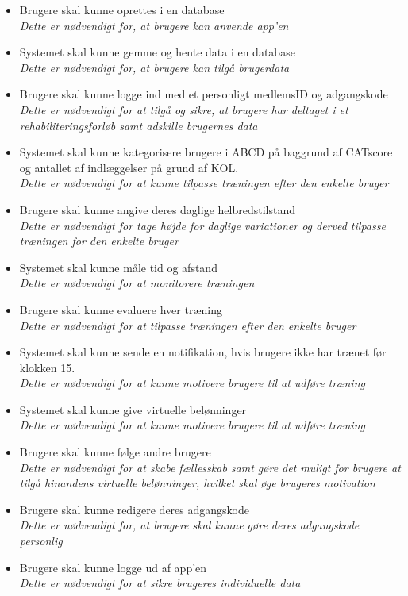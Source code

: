 \noindent 
\begin{itemize}
\item Brugere skal kunne oprettes i en database
	\\
	\textit{Dette er nødvendigt for, at brugere kan anvende app'en}
	\item Systemet skal kunne gemme og hente data i en database
\\
\textit{Dette er nødvendigt for, at brugere kan tilgå brugerdata}
\item Brugere skal kunne logge ind med et personligt medlemsID og adgangskode
	\\
	\textit{Dette er nødvendigt for at tilgå og sikre, at brugere har deltaget i et rehabiliteringsforløb samt adskille brugernes data}
\item Systemet skal kunne kategorisere brugere i ABCD på baggrund af CATscore og  antallet af indlæggelser på grund af KOL. 
	\\
	\textit{Dette er nødvendigt for at kunne tilpasse træningen efter den enkelte bruger}
\item Brugere skal kunne angive deres daglige helbredstilstand 
	\\
\textit{Dette er nødvendigt for tage højde for daglige variationer og derved tilpasse træningen for den enkelte bruger}
\item Systemet skal kunne måle tid og afstand
	\\
\textit{Dette er nødvendigt for at monitorere træningen}
\item Brugere skal kunne evaluere hver træning
	\\
\textit{Dette er nødvendigt for at tilpasse træningen efter den enkelte bruger}		
\item Systemet skal kunne sende en notifikation, hvis brugere ikke har trænet før klokken 15. 
	\\
	\textit{Dette er nødvendigt for at kunne motivere brugere til at udføre træning}
	
	\item Systemet skal kunne give virtuelle belønninger 
	\\
	\textit{Dette er nødvendigt for at kunne motivere brugere til at udføre træning}
\item Brugere skal kunne følge andre brugere 
	\\
	\textit{Dette er nødvendigt for at skabe fællesskab samt gøre det muligt for brugere at tilgå hinandens virtuelle belønninger, hvilket skal øge brugeres motivation}
\item Brugere skal kunne redigere deres adgangskode
	\\
	\textit{Dette er nødvendigt for, at brugere skal kunne gøre deres adgangskode personlig}
\item Brugere skal kunne logge ud af app'en
	\\
	\textit{Dette er nødvendigt for at sikre brugeres individuelle data}
\end{itemize}


